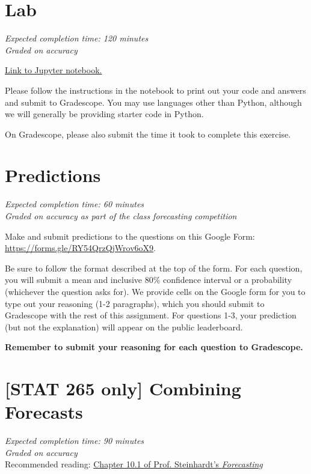 \documentclass[11pt]{article}
\begin{document}
\section*{Lab}

\emph{Expected completion time: 120 minutes} \\
\emph{Graded on accuracy}


\href{https://datahub.berkeley.edu/hub/user-redirect/git-pull?repo=https%3A%2F%2Fgithub.com%2Frsha256%2Fforecasting-class-sp24&branch=main&urlpath=tree%2Fforecasting-class-sp24%2Fhw%2Fhw5%2Fhw5lab.ipynb}{Link to Jupyter notebook.}

Please follow the instructions in the notebook to print out your code and answers and submit to Gradescope. You may use languages other than Python, although we will generally be providing starter code in Python.

On Gradescope, please also submit the time it took to complete this exercise.

\section*{Predictions} 

\emph{Expected completion time: 60 minutes} \\
\emph{Graded on accuracy as part of the class forecasting competition}

Make and submit predictions to the questions on this Google Form: \\ \url{https://forms.gle/RY54QrzQjWrov6oX9}.

Be sure to follow the format
described at the top of the form.
For each question, you will submit a mean and inclusive 80\% confidence interval or a probability (whichever the question asks for). We provide cells on the Google form for you to type out your reasoning (1-2 paragraphs), which you should submit to Gradescope with the rest of this assignment.
For questions 1-3, your prediction (but not the explanation) will appear on the public leaderboard.

\textbf{Remember to submit your reasoning for each question to Gradescope.}

\newpage
\section*{[STAT 265 only] Combining Forecasts}
\emph{Expected completion time: 90 minutes} \\
\emph{Graded on accuracy} \\
Recommended reading: \href{https://forecasting.quarto.pub/book/combining-forecasts-part2.html#weighting-experts}{Chapter 10.1 of Prof. Steinhardt's \textit{Forecasting}}
\end{document}
